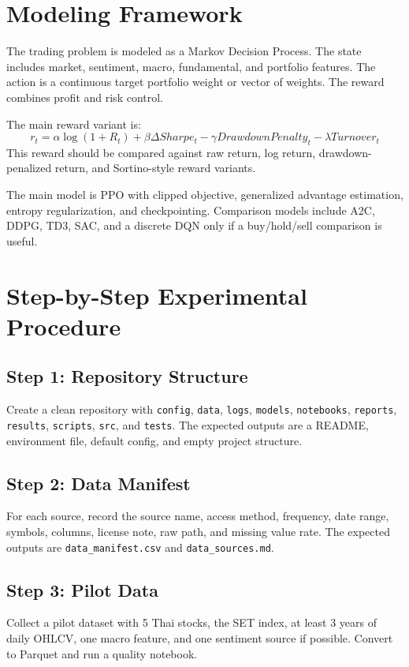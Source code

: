 \documentclass[11pt]{article}
\begin{document}
\section{Modeling Framework}
The trading problem is modeled as a Markov Decision Process. The state includes market, sentiment, macro, fundamental, and portfolio features. The action is a continuous target portfolio weight or vector of weights. The reward combines profit and risk control.

The main reward variant is:
\[
r_t = \alpha \log(1+R_t) + \beta \Delta Sharpe_t - \gamma DrawdownPenalty_t - \lambda Turnover_t
\]
This reward should be compared against raw return, log return, drawdown-penalized return, and Sortino-style reward variants.

The main model is PPO with clipped objective, generalized advantage estimation, entropy regularization, and checkpointing. Comparison models include A2C, DDPG, TD3, SAC, and a discrete DQN only if a buy/hold/sell comparison is useful.

\section{Step-by-Step Experimental Procedure}
\subsection{Step 1: Repository Structure}
Create a clean repository with \texttt{config}, \texttt{data}, \texttt{logs}, \texttt{models}, \texttt{notebooks}, \texttt{reports}, \texttt{results}, \texttt{scripts}, \texttt{src}, and \texttt{tests}. The expected outputs are a README, environment file, default config, and empty project structure.

\subsection{Step 2: Data Manifest}
For each source, record the source name, access method, frequency, date range, symbols, columns, license note, raw path, and missing value rate. The expected outputs are \texttt{data\_manifest.csv} and \texttt{data\_sources.md}.

\subsection{Step 3: Pilot Data}
Collect a pilot dataset with 5 Thai stocks, the SET index, at least 3 years of daily OHLCV, one macro feature, and one sentiment source if possible. Convert to Parquet and run a quality notebook.
\end{document}
